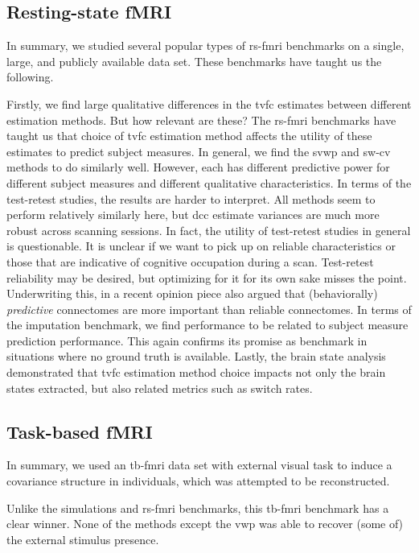 \subsection{Resting-state fMRI}\label{subsec:benchmarking-discussion-rs-fmri}

In summary, we studied several popular types of \gls{rs-fmri} benchmarks on a single, large, and publicly available data set.
These benchmarks have taught us the following.

Firstly, we find large qualitative differences in the \gls{tvfc} estimates between different estimation methods.
But how relevant are these?
%
The \gls{rs-fmri} benchmarks have taught us that choice of \gls{tvfc} estimation method affects the utility of these estimates to predict subject measures.
In general, we find the \gls{svwp} and \gls{sw-cv} methods to do similarly well.
However, each has different predictive power for different subject measures and different qualitative characteristics.
%
In terms of the test-retest studies, the results are harder to interpret.
All methods seem to perform relatively similarly here, but \gls{dcc} estimate variances are much more robust across scanning sessions.
In fact, the utility of test-retest studies in general is questionable.
It is unclear if we want to pick up on reliable characteristics or those that are indicative of cognitive occupation during a scan.
Test-retest reliability may be desired, but optimizing for it for its own sake misses the point.
Underwriting this, in a recent opinion piece \textcite{Finn2021b} also argued that (behaviorally) \emph{predictive} connectomes are more important than reliable connectomes.
%
In terms of the imputation benchmark, we find performance to be related to subject measure prediction performance.
This again confirms its promise as benchmark in situations where no ground truth is available.
%
Lastly, the brain state analysis demonstrated that \gls{tvfc} estimation method choice impacts not only the brain states extracted, but also related metrics such as switch rates.

\subsection{Task-based fMRI}

In summary, we used an \gls{tb-fmri} data set with external visual task to induce a covariance structure in individuals, which was attempted to be reconstructed.

Unlike the simulations and \gls{rs-fmri} benchmarks, this \gls{tb-fmri} benchmark has a clear winner.
None of the methods except the \gls{vwp} was able to recover (some of) the external stimulus presence.

